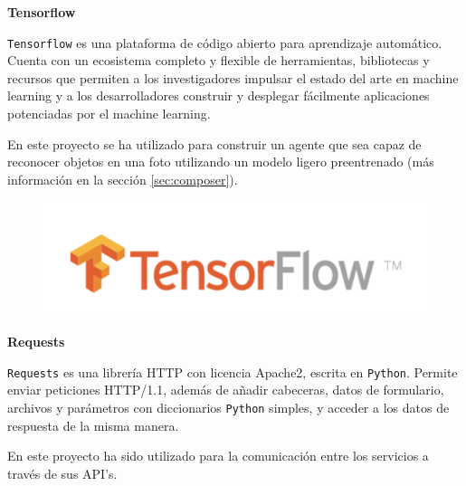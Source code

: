 \vspace{-0.6cm}

\textbf{Tensorflow}

\texttt{Tensorflow}  es una plataforma de código abierto para aprendizaje automático. Cuenta con un ecosistema completo y flexible de herramientas, bibliotecas y recursos que permiten a los investigadores impulsar el estado del arte en machine learning y a los desarrolladores construir y desplegar fácilmente aplicaciones potenciadas por el machine learning.

En este proyecto se ha utilizado para construir un agente que sea capaz de reconocer objetos en una foto utilizando un modelo ligero preentrenado (más información en la sección \ref{sec:composer}).

\begin{figure}[h]
	\centering
	\includegraphics[scale=0.12]{images/19}
\end{figure}

\textbf{Requests}

\texttt{Requests} \cite{ref18} es una librería HTTP con licencia Apache2, escrita en \texttt{Python}. Permite enviar peticiones HTTP/1.1, además de añadir cabeceras, datos de formulario, archivos y parámetros con diccionarios \texttt{Python} simples, y acceder a los datos de respuesta de la misma manera.

En este proyecto ha sido utilizado para la comunicación entre los servicios a través de sus API's.

